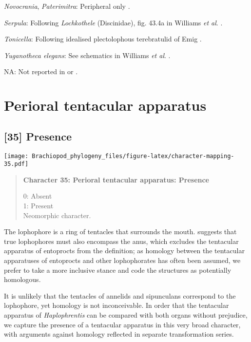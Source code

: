 \documentclass[openany]{book}
\theoremstyle{definition}
\theoremstyle{definition}
\theoremstyle{definition}
\theoremstyle{remark}
\begin{document}
\hypertarget{Novocrania-coding-34}{}
\emph{Novocrania}, \emph{Paterimitra}: Peripheral only
\citep{Williams1998Thediversity, Williams2000LinguliformeaCraniiformea}.

\hypertarget{Serpula-coding-34}{}
\emph{Serpula}: Following \emph{Lochkothele} (Discinidae), fig. 43.4a in
Williams \emph{et al}.
\citeyearpar{Williams2000LinguliformeaCraniiformea}.

\hypertarget{Tonicella-coding-34}{}
\emph{Tonicella}: Following idealised plectolophous terebratulid of Emig
\citeyearpar{Emig1992Functionaldisposition}.

\hypertarget{Yuganotheca_elegans-coding-34}{}
\emph{Yuganotheca elegans}: See schematics in Williams \emph{et al}.
\citeyearpar{Williams2000LinguliformeaCraniiformea}.

\hypertarget{NA-coding-34}{}
NA: Not reported in \citet{Havlicek1982LingulaceaPaterinacea} or
\citet{Williams2000LinguliformeaCraniiformea}.

\section{Perioral tentacular
apparatus}\label{perioral-tentacular-apparatus}

\subsection*{{[}35{]} Presence}\label{presence-1}

\texttt{[image: Brachiopod\_phylogeny\_files/figure-latex/character-mapping-35.pdf]}

\begin{quote}
\textbf{Character 35: Perioral tentacular apparatus: Presence}

0: Absent\\
1: Present\\
Neomorphic character.
\end{quote}

The lophophore is a ring of tentacles that surrounds the mouth.
\citet{Temereva2017Innervationof} suggests that true lophophores must
also encompass the anus, which excludes the tentacular apparatus of
entoprocts from the definition; as homology between the tentacular
apparatuses of entoprocts and other lophophorates has often been
assumed, we prefer to take a more inclusive stance and code the
structures as potentially homologous.

It is unlikely that the tentacles of annelids and sipunculans correspond
to the lophophore, yet homology is not inconceivable. In order that the
tentacular apparatus of \emph{Haplophrentis} can be compared with both
organs without prejudice, we capture the presence of a tentacular
apparatus in this very broad character, with arguments against homology
reflected in separate transformation series.
\end{document}
